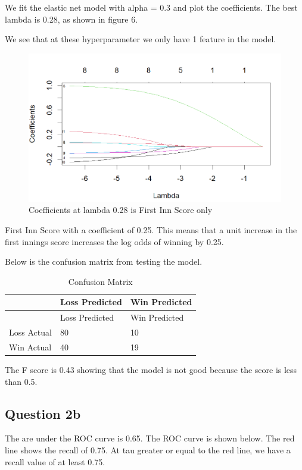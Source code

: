 \documentclass[
]{article}
\begin{document}
We fit the elastic net model with alpha = 0.3 and plot the coefficients.
The best lambda is 0.28, as shown in figure 6.

We see that at these hyperparameter we only have 1 feature in the model.

\begin{figure}
\centering
\includegraphics{coef_ipl.png}
\caption{Coefficients at lambda 0.28 is First Inn Score only}
\end{figure}

First Inn Score with a coefficient of 0.25. This means that a unit
increase in the first innings score increases the log odds of winning by
0.25.

Below is the confusion matrix from testing the model.

\begin{longtable}[]{@{}lll@{}}
\caption{Confusion Matrix}\tabularnewline
\toprule\noalign{}
& Loss Predicted & Win Predicted \\
\midrule\noalign{}
\endfirsthead
\toprule\noalign{}
& Loss Predicted & Win Predicted \\
\midrule\noalign{}
\endhead
\bottomrule\noalign{}
\endlastfoot
Loss Actual & 80 & 10 \\
Win Actual & 40 & 19 \\
\end{longtable}

The F score is 0.43 showing that the model is not good because the score
is less than 0.5.

\hypertarget{question-2b}{%
\subsection{Question 2b}\label{question-2b}}

The are under the ROC curve is 0.65. The ROC curve is shown below. The
red line shows the recall of 0.75. At tau greater or equal to the red
line, we have a recall value of at least 0.75.
\end{document}
